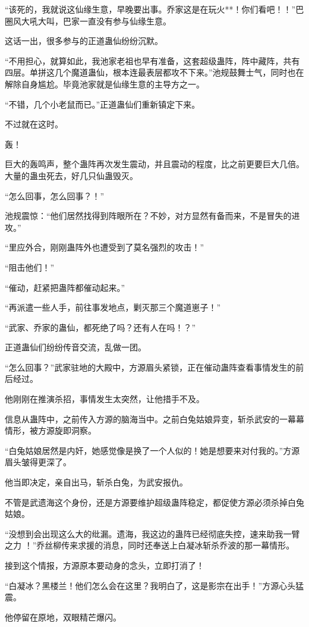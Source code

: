 \begin{this_body}
“该死的，我就说这仙缘生意，早晚要出事。乔家这是在玩火**！你们看吧！！”巴圈风大吼大叫，巴家一直没有参与仙缘生意。

这话一出，很多参与的正道蛊仙纷纷沉默。

“不用担心，就算如此，我池家老祖也早有准备，这套超级蛊阵，阵中藏阵，共有四层。单拼这几个魔道蛊仙，根本连最表层都攻不下来。”池规鼓舞士气，同时也在解除自身尴尬。毕竟池家就是仙缘生意的主导方之一。

“不错，几个小老鼠而已。”正道蛊仙们重新镇定下来。

不过就在这时。

轰！

巨大的轰鸣声，整个蛊阵再次发生震动，并且震动的程度，比之前更要巨大几倍。大量的蛊虫死去，好几只仙蛊毁灭。

“怎么回事，怎么回事？！”

池规震惊：“他们居然找得到阵眼所在？不妙，对方显然有备而来，不是冒失的进攻。”

“里应外合，刚刚蛊阵外也遭受到了莫名强烈的攻击！”

“阻击他们！”

“催动，赶紧把蛊阵都催动起来。”

“再派遣一些人手，前往事发地点，剿灭那三个魔道崽子！”

“武家、乔家的蛊仙，都死绝了吗？还有人在吗！？”

正道蛊仙们纷纷传音交流，乱做一团。

“怎么回事？”武家驻地的大殿中，方源眉头紧锁，正在催动蛊阵查看事情发生的前后经过。

他刚刚在推演杀招，事情发生太突然，让他措手不及。

信息从蛊阵中，之前传入方源的脑海当中。之前白兔姑娘异变，斩杀武安的一幕幕情形，被方源旋即洞察。

“白兔姑娘居然是内奸，她感觉像是换了一个人似的！她是想要来对付我的。”方源眉头皱得更深了。

他当即决定，亲自出马，斩杀白兔，为武安报仇。

不管是武遗海这个身份，还是方源要维护超级蛊阵稳定，都促使方源必须杀掉白兔姑娘。

“没想到会出现这么大的纰漏。遗海，我这边的蛊阵已经彻底失控，速来助我一臂之力 ！”乔丝柳传来求援的消息，同时还奉送上白凝冰斩杀乔波的那一幕情形。

接到这个情报，方源原本要动身的念头，立即打消了！

“白凝冰？黑楼兰！他们怎么会在这里？我明白了，这是影宗在出手！”方源心头猛震。

他停留在原地，双眼精芒爆闪。


\end{this_body}
